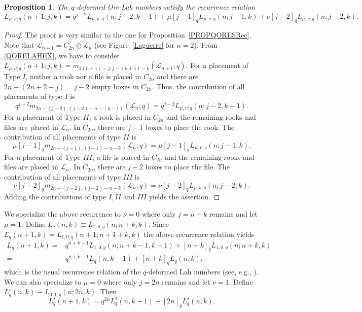 \documentclass[10pt]{amsart}
\newtheorem{proposition}[theorem]{Proposition}%
\begin{document}
\begin{proposition}\label{OreLahRec} The $q$-deformed Ore-Lah numbers satisfy the recurrence relation
$$
L_{\mu,\nu;q}(n+1;j,k) =q^{j-2}L_{\mu,\nu;q}(n;j-2,k-1)+\mu [j-1]_q L_{\mu,\nu;q}(n;j-1,k) +\nu [j-2]_q L_{\mu,\nu;q}(n;j-2,k).  
$$
\end{proposition}
\begin{proof}
The proof is very similar to the one for Proposition~\ref{PROPQORESRec}. Note that ${\mathcal L}_{n+1}=C_{2n}\oplus {\mathcal L}_n$ (see Figure~\ref{Laguerre} for $n=2$). From \eqref{QORELAHEX}, we have to consider $L_{\mu,\nu;q}(n+1;j,k)=m_{2(n+1)-j,j-(n+1)-k}({\mathcal L}_{n+1};q)$. For a placement of Type $I$, neither a rook nor a file is placed in $C_{2n}$ and there are $2n-(2n+2-j)=j-2$ empty boxes in $C_{2n}$. Thus, the contribution of all placements of type $I$ is
$$
q^{j-2}m_{2n-(j-2),(j-2)-n-(k-1)}({\mathcal L}_{n};q)=q^{j-2}L_{\mu,\nu;q}(n;j-2,k-1).
$$
For a placement of Type $II$, a rook is placed in $C_{2n}$ and the remaining rooks and files are placed in ${\mathcal L}_{n}$.  In $C_{2n}$, there are $j-1$ boxes to place the rook. The contribution of all placements of type $II$ is
$$
\mu [j-1]_q m_{2n-(j-1),(j-1)-n-k}({\mathcal L}_{n};q)=\mu [j-1]_q L_{\mu,\nu;q}(n;j-1,k).
$$ 
For a placement of Type $III$, a file is placed in $C_{2n}$ and the remaining rooks and files are placed in ${\mathcal L}_{n}$.  In $C_{2n}$, there are $j-2$ boxes to place the file. The contribution of all placements of type $III$ is
$$
\nu [j-2]_q m_{2n-(j-2),(j-2)-n-k}({\mathcal L}_{n};q)=\nu [j-2]_q L_{\mu,\nu;q}(n;j-2,k).
$$ 
Adding the contributions of type $I,II$ and $III$ yields the assertion.
\end{proof}
We specialize the above recurrence to $\nu=0$ where only $j=n+k$ remains and let $\mu=1$. Define $L_q(n,k)\equiv L_{1,0;q}(n;n+k,k)$. Since $L_q(n+1,k)=L_{1,0;q}(n+1;n+1+k,k)$ the above recurrence relation yields
\begin{align*}
L_q(n+1,k)=& q^{n+k-1}L_{1,0;q}(n;n+k-1,k-1)+[n+k]_q L_{1,0;q}(n;n+k,k) \\
 =& q^{n+k-1}L_q(n,k-1)+[n+k]_q L_q(n,k),
\end{align*}
which is the usual recurrence relation of the $q$-deformed Lah numbers (see, e.g., \cite{TMMS2016}). We can also specialize to $\mu=0$ where only $j=2n$ remains and let $\nu=1$. Define $L^{s}_q(n,k)\equiv L_{0,1;q}(n;2n,k)$. Then
$$
L^{s}_q(n+1,k)=q^{2n}L^{s}_q(n,k-1)+[2n]_q L^{s}_q(n,k).
$$
\end{document}
